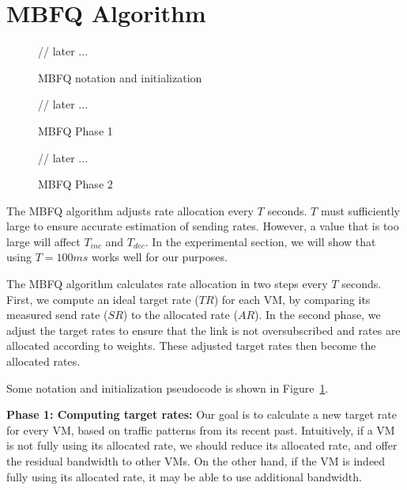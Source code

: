 \section{MBFQ Algorithm}
\label{sec:algorithm}

\begin{figure}[t]
{\footnotesize
\begin{algorithmic}
\State // later ...
\end{algorithmic}
}
\caption{MBFQ notation and initialization}
\label{fig:mbfq_init}
\end{figure}

\begin{figure}[t]
{\footnotesize
\begin{algorithmic}
\State // later ...
\end{algorithmic}
}
\caption{MBFQ Phase 1}
\label{fig:mbfq_p1}
\end{figure}

\begin{figure}[t]
{\footnotesize
\begin{algorithmic}
\State // later ...
\end{algorithmic}
}
\caption{MBFQ Phase 2}
\label{fig:mbfq_p2}
\end{figure}

The MBFQ algorithm adjusts rate allocation every $T$ seconds.  $T$ must
sufficiently large to ensure accurate estimation of sending rates. However, a
value that is too large will affect $T_{inc}$ and $T_{dec}$.  In the
experimental section, we will show that using $T=100ms$ works well for our
purposes. 

The MBFQ algorithm calculates rate allocation in two steps every $T$ seconds.
First, we compute an ideal target rate ($TR$) for each VM, by comparing its
measured send rate ($SR$) to the allocated rate ($AR$). In the second phase, we
adjust the target rates to ensure that the link is not oversubscribed and rates
are allocated according to weights. These adjusted target rates then become the
allocated rates.

Some notation and initialization pseudocode is shown in
Figure~\ref{fig:mbfq_init}.

{\bf Phase 1: Computing target rates:} 
Our goal is to calculate a new target rate for every VM, based on traffic
patterns from its recent past.  Intuitively, if a VM is not fully using its
allocated rate, we should reduce its allocated rate, and offer the residual
bandwidth to other VMs. On the other hand, if the VM is indeed fully using its
allocated rate, it may be able to use additional bandwidth. 

